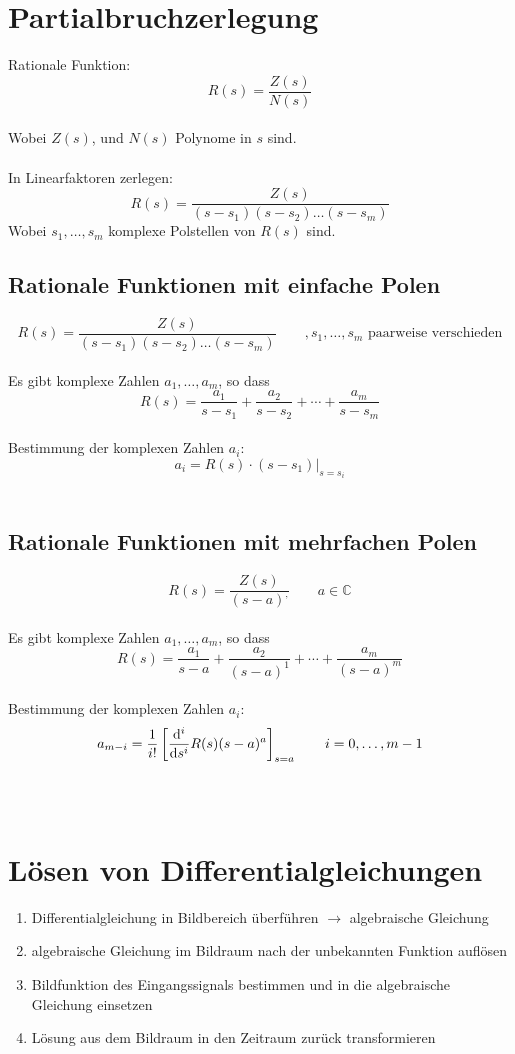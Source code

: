 \section{Partialbruchzerlegung}
Rationale Funktion:
\[
	R(s) = \frac{Z(s)}{N(s)}
\]
\\
Wobei $Z(s)$, und $N(s)$ Polynome in $s$ sind.\\
\\
In Linearfaktoren zerlegen:
\[
	R(s) = \frac{Z(s)}{(s-s_1)(s-s_2)\ldots(s-s_m)}
\]
Wobei $s_1,\ldots ,s_m$ komplexe Polstellen von $R(s)$ sind.

\subsection{Rationale Funktionen mit einfache Polen}
\[
	R(s) = \frac{Z(s)}{(s-s_1)(s-s_2)\ldots(s-s_m)} \qquad , s_1,\ldots ,s_m \text{ paarweise verschieden}
\]
\\
Es gibt komplexe Zahlen $a_1,\ldots ,a_m$, so dass
\[
	R(s)=\frac{a_1}{s-s_1}+\frac{a_2}{s-s_2}+\cdots+\frac{a_m}{s-s_m}
\]
\\
Bestimmung der komplexen Zahlen $a_i$:
\[
	a_i=\left.R(s)\cdot(s-s_1)\right|_{s=s_i}
\]
\\

\subsection{Rationale Funktionen mit mehrfachen Polen}
\[
	R(s) = \frac{Z(s)}{(s-a)^,} \qquad a \in \mathbb{C}
\]
\\
Es gibt komplexe Zahlen $a_1,\ldots ,a_m$, so dass
\[
	R(s)=\frac{a_1}{s-a}+\frac{a_2}{(s-a)^1}+\cdots+\frac{a_m}{(s-a)^m}
\]
\\
Bestimmung der komplexen Zahlen $a_i$:
\[
	a_{m-i} = \frac{1}{i!}\left[\frac{\mathrm{d} ^i}{\mathrm{d} s^i}R(s)(s-a)^a\right]_{s=a} \qquad i=0,\ldots,m-1
\]
\\\\

\section{Lösen von Differentialgleichungen}
\begin{enumerate}
	\item Differentialgleichung in Bildbereich überführen $\rightarrow$ algebraische Gleichung
	\item algebraische Gleichung im Bildraum nach der unbekannten Funktion auflösen
	\item Bildfunktion des Eingangssignals bestimmen und in die algebraische Gleichung einsetzen
	\item Lösung aus dem Bildraum in den Zeitraum zurück transformieren
\end{enumerate}

